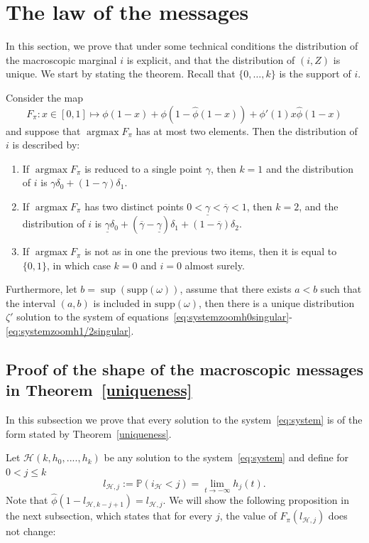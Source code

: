 \documentclass[11pt]{article}
\DeclareMathOperator*{\argmax}{argmax}
\begin{document}
\section{The law of the messages}\label{sec:marginali}
In this section, we prove that under some technical conditions the distribution of the macroscopic marginal $i$ is explicit, and that the distribution of $(i,Z)$ is unique. We start by stating the theorem. Recall that $\{0,\dots,k\}$ is the support of $i$.
\begin{theorem}\label{uniqueness}
    Consider the map 
    \[
    F_\pi: x \in [0,1] \mapsto \phi(1-x)+\phi(1-\hat{\phi}(1-x))+\phi'(1)x\hat{\phi}(1-x)
    \]
    and suppose that $\argmax F_\pi$ has at most two elements.
    Then the distribution of $i$ is described by:
    \begin{enumerate}
        \item If $\argmax F_\pi$ is reduced to a single point $\gamma$, then $k=1$ and the distribution of $i$ is $\gamma \delta_0 + (1-\gamma) \delta_1$.
        \item If $\argmax F_\pi$ has two distinct points $0<\underline{\gamma}< \overline{\gamma}<1$, then $k=2$, and  the distribution of $i$ is $\underline{\gamma}\delta_0+(\overline{\gamma}-\underline{\gamma})\delta_1+(1-\overline{\gamma})\delta_2$.
        \item If $\argmax F_\pi$ is not as in one the previous two items, then it is equal to $\{0,1\}$, in which case $k=0$ and $i=0$ almost surely.
    \end{enumerate}
    Furthermore, let $b=\sup( \mathrm{supp}(\omega))$, assume that there exists $a<b$ such that the interval $(a,b)$ is included in $\mathrm{supp}(\omega)$, then there is a unique distribution $\zeta'$ solution to the system of equations~\eqref{eq:systemzoomh0singular}-\eqref{eq:systemzoomh1/2singular}.
\end{theorem}

\subsection{Proof of the shape of the macroscopic messages in Theorem~\ref{uniqueness}}
In this subsection we prove that every solution to the system~\eqref{eq:system} is of the form stated by Theorem~\ref{uniqueness}.

Let $\mathcal{H}(k,h_{0},....,h_{k})$ be any solution to the system~\eqref{eq:system} and define  for $0<j\leq k$ \[l_{\mathcal{H},j} := \mathbb{P}(i_{\mathcal{H}}<j)=\lim_{t \rightarrow -\infty}h_j(t) .\]
Note that $\hat{\phi}(1-l_{\mathcal{H},k-j+1})=l_{\mathcal{H},j}$. We will show the following proposition in the next subsection, which states that for every $j$, the value of $F_\pi(l_{\mathcal{H},j})$ does not change:
\end{document}
